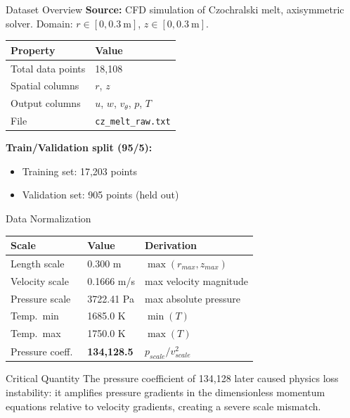 \documentclass[aspectratio=169]{beamer}
\begin{document}
\begin{frame}{Dataset Overview}
\textbf{Source:} CFD simulation of Czochralski melt, axisymmetric solver.
Domain: $r \in [0, 0.3~\text{m}]$, $z \in [0, 0.3~\text{m}]$.

\vspace{0.3cm}
\begin{table}
\centering
\begin{tabular}{ll}
\toprule
Property & Value \\
\midrule
Total data points & 18,108 \\
Spatial columns & $r$, $z$ \\
Output columns & $u$, $w$, $v_\theta$, $p$, $T$ \\
File & \texttt{cz\_melt\_raw.txt} \\
\bottomrule
\end{tabular}
\end{table}

\vspace{0.3cm}
\textbf{Train/Validation split (95/5):}
\begin{itemize}
  \item Training set: 17,203 points
  \item Validation set: 905 points (held out)
\end{itemize}
\end{frame}

\begin{frame}{Data Normalization}
\begin{table}
\centering
\small
\begin{tabular}{lll}
\toprule
Scale & Value & Derivation \\
\midrule
Length scale & 0.300 m & $\max(r_{max}, z_{max})$ \\
Velocity scale & 0.1666 m/s & max velocity magnitude \\
Pressure scale & 3722.41 Pa & max absolute pressure \\
Temp.\ min & 1685.0 K & $\min(T)$ \\
Temp.\ max & 1750.0 K & $\max(T)$ \\
Pressure coeff.\ & \textbf{134,128.5} & $p_{scale}/v_{scale}^2$ \\
\bottomrule
\end{tabular}
\end{table}

\begin{alertblock}{Critical Quantity}
The pressure coefficient of 134{,}128 later caused physics loss instability: it amplifies pressure gradients in the dimensionless momentum equations relative to velocity gradients, creating a severe scale mismatch.
\end{alertblock}
\end{frame}
\end{document}
